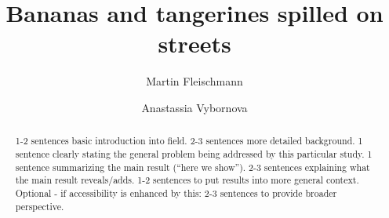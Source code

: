 \documentclass{josis}
\begin{document}


\title{Bananas and tangerines spilled on streets}

\author{Martin Fleischmann}
\author{Anastassia Vybornova}

\maketitle


\begin{abstract}
    1-2 sentences basic introduction into field. 2-3 sentences more detailed background. 1 sentence clearly stating the general problem being addressed by this particular study. 1 sentence summarizing the main result (“here we show”). 2-3 sentences explaining what the main result reveals/adds. 1-2 sentences to put results into more general context. Optional - if accessibility is enhanced by this: 2-3 sentences to provide broader perspective.
\end{abstract}












\end{document}
